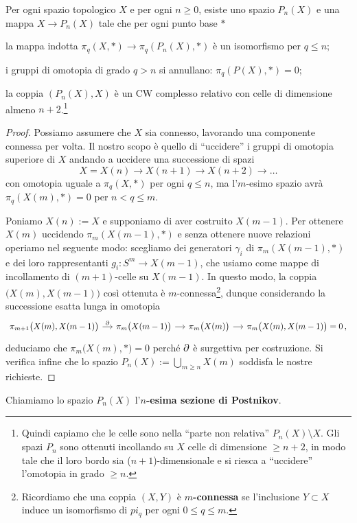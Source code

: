 \begin{thm}\label{sez-Postnikov}
	Per ogni spazio topologico $X$ e
	per ogni $n \ge 0$,
	esiste uno spazio $P_{n}(X)$ e una mappa $X \to P_{n}(X)$
	tale che per ogni punto base $\ast$
	\begin{rmnumerate}
		\item la mappa indotta
		$\pi_{q}(X, \ast) \to \pi_{q}(P_{n}(X),\ast)$
		è un isomorfismo per $q \le n$;
		\item i gruppi di omotopia di grado $q > n$ si annullano: $\pi_{q}(P(X),\ast)=0$; 
		\item la coppia $(P_{n}(X),X)$ è un CW complesso relativo 
		con celle di dimensione almeno $n+2$.\footnote{Quindi capiamo che le celle sono nella ``parte non relativa'' $P_{n}(X) \setminus X$. Gli spazi $P_{n}$ sono ottenuti incollando su $X$ celle di dimensione $\ge n+2$, in modo tale che il loro bordo sia ($n+1$)-dimensionale e si riesca a ``uccidere'' l'omotopia in grado $\ge n$.}
	\end{rmnumerate}
	\begin{proof}
		Possiamo assumere che $X$ sia connesso, lavorando una componente
		connessa per volta. Il nostro scopo è quello di ``uccidere'' i
		gruppi di omotopia superiore di $X$ andando a uccidere
		una successione di spazi
		\begin{equation*}
			X = X(n) \longrightarrow X(n+1) \longrightarrow X(n+2) \longrightarrow \dots
		\end{equation*}
		con omotopia uguale a $\pi_{q}(X,\ast)$ per ogni $q \le n$,
		ma l'$m$-esimo spazio avrà $\pi_{q}(X(m),\ast)=0$ per $n < q \le m$.
		
		Poniamo $X(n):=X$ e supponiamo di aver costruito $X(m-1)$.
		Per ottenere $X(m)$ uccidendo $\pi_{m}(X(m-1),\ast)$
		e senza ottenere nuove relazioni operiamo nel seguente modo:
		scegliamo dei generatori $\gamma_{i}$ di $\pi_{m}(X(m-1),\ast)$
		e dei loro rappresentanti $g_{i}:S^{m} \to X(m-1)$,
		che usiamo come mappe di incollamento di $(m+1)$-celle su $X(m-1)$.
		In questo modo, la coppia $\big(X(m),X(m-1)\big)$ così ottenuta 
		è $m$-connessa\footnote{Ricordiamo che una coppia $(X,Y)$ è \textbf{$m$-connessa} 
		se l'inclusione $Y \subset X$ induce un isomorfismo di $pi_{q}$ 
		per ogni $0 \le q \le m$.},
		dunque considerando la successione esatta lunga in omotopia
		\begin{equation*}
			\begin{tikzcd}[column sep=small]
				\pi_{m+1}\big(X(m),X(m-1)\big) \ar[r, "\de"]
				& \pi_{m}\big(X(m-1)\big) \ar[r]
				& \pi_{m}\big(X(m)\big) \ar[r]
				& \pi_{m}\big(X(m),X(m-1)\big) = 0\,,
			\end{tikzcd}
		\end{equation*}
		deduciamo che $\pi_{m}\big(X(m),\ast\big)=0$ perché $\partial$ è surgettiva per costruzione.
		Si verifica infine che lo spazio $P_{n}(X) := \bigcup_{m \ge n} X(m)$
		soddisfa le nostre richieste.
	\end{proof}
\end{thm}

\begin{df}
	Chiamiamo lo spazio $P_{n}(X)$ l'\textbf{$n$-esima sezione di Postnikov}.
\end{df}